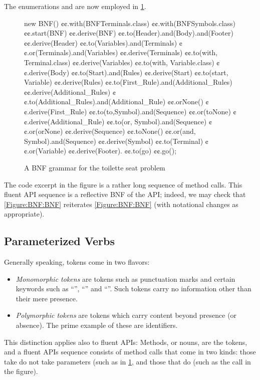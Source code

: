 The
enumerations  and
  are now employed in \cref{Figure:BNF:fluent}.

\begin{figure}[H]
  \begin{JAVA}[style=numbered]
new BNF()
  ¢¢.with(BNFTerminals.class)
  ¢¢.with(BNFSymbols.class)
  ¢¢.start(BNF)
  ¢¢.derive(BNF)
    ¢¢.to(Header).and(Body).and(Footer)
  ¢¢.derive(Header)
    ¢¢.to(Variables).and(Terminals)
    ¢¢.or(Terminals).and(Variables)
  ¢¢.derive(Terminals)
    ¢¢.to(with, Terminal.class)
  ¢¢.derive(Variables)
    ¢¢.to(with, Variable.class)
  ¢¢.derive(Body)
    ¢¢.to(Start).and(Rules)
  ¢¢.derive(Start)
    ¢¢.to(start, Variable)
  ¢¢.derive(Rules)
    ¢¢.to(First_Rule).and(Additional_Rules)
  ¢¢.derive(Additional_Rules)
    ¢¢.to(Additional_Rules).and(Additional_Rule)
    ¢¢.orNone()
  ¢¢.derive(First_Rule)
    ¢¢.to(to,Symbol).and(Sequence)
    ¢¢.or(toNone)
  ¢¢.derive(Additional_Rule)
    ¢¢.to(or, Symbol).and(Sequence)
    ¢¢.or(orNone)
  ¢¢.derive(Sequence)
    ¢¢.toNone()
    ¢¢.or(and, Symbol).and(Sequence)
  ¢¢.derive(Symbol)
    ¢¢.to(Terminal)
    ¢¢.or(Variable)
  ¢¢.derive(Footer).
   ¢¢.to(go)
¢¢.go();\end{JAVA}
  \caption{A BNF grammar for the toilette seat problem}
  \label{Figure:BNF:fluent}
\end{figure}

The code excerpt in the figure is a rather long
  sequence of method calls.
This fluent API sequence is a reflective BNF 
  of the \Self API;
  indeed, we may check that \cref{Figure:BNF:BNF} reiterates \cref{Figure:BNF:BNF}
  (with notational changes as appropriate). 

\subsection{Parameterized Verbs}
Generally speaking, tokens come in two flavors:
\begin{itemize}
  \item \emph{Monomorphic tokens} are tokens such as punctuation marks and
    certain keywords such as ``'', ``'' and ``''.
    Such tokens carry no information other than their mere presence.
  \item \emph{Polymorphic tokens} are tokens which carry content beyond
    presence (or absence).  The prime example of these are identifiers.
\end{itemize}

This distinction applies also to fluent APIs:
Methods, or nouns, are the tokens, and a fluent APIs sequence consists of 
method calls that come in two kinds: those take do not take parameters (such as
 in \cref{Figure:BNF:fluent}, and those that do (such as the call
 in the figure).

